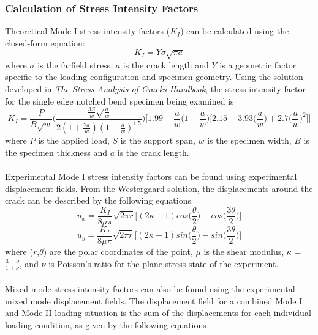 \documentclass[12pt]{article}
\begin{document}
\subsubsection{Calculation of Stress Intensity Factors} %
Theoretical Mode I stress intensity factors ($K_{I}$) can be calculated using the closed-form equation:
\begin{equation}
K_{I} = Y\sigma\sqrt{\pi a}
\end{equation}
where $\sigma$ is the farfield stress, $a$ is the crack length and $Y$ is a geometric factor specific to the loading configuration and specimen geometry. Using the solution developed in \textit{The Stress Analysis of Cracks Handbook}, the stress intensity factor for the single edge notched bend specimen being examined is \cite{notch}
\begin{equation}
K_{I} = \frac{P}{B\sqrt{w}}\Bigg(\frac{\frac{3S}{w}\sqrt{\frac{a}{w}}}{2(1+\frac{2a}{w})(1-\frac{a}{w})^{1.5}}\Bigg)\Bigg[1.99-\frac{a}{w}\Big(1-\frac{a}{w}\Big)\Big[2.15-3.93\Big(\frac{a}{w}\Big)+2.7\Big(\frac{a}{w}\Big)^2\Big]\Bigg]
\end{equation}
where $P$ is the applied load, $S$ is the support span, $w$ is the specimen width, $B$ is the specimen thickness and $a$ is the crack length. 
\\ \\
Experimental Mode I stress intensity factors can be found using experimental displacement fields. From the Westergaard solution, the displacements around the crack can be described by the following equations \cite{Fracture}
\begin{equation}
u_{x} = \frac{K_{I}}{8\mu \pi}\sqrt{2\pi r}\bigg[(2\kappa-1)cos\bigg(\frac{\theta}{2}\bigg)-cos\bigg(\frac{3\theta}{2}\bigg)\bigg]
\end{equation}
\begin{equation}
u_{y} = \frac{K_{I}}{8\mu \pi}\sqrt{2\pi r}\bigg[(2\kappa+1)sin\bigg(\frac{\theta}{2}\bigg)-sin\bigg(\frac{3\theta}{2}\bigg)\bigg]
\end{equation}
where ($r$,$\theta$) are the polar coordinates of the point, $\mu$ is the shear modulus, $\kappa$ = $\frac{3-\nu}{1+\nu}$, and $\nu$ is Poisson's ratio for the plane stress state of the experiment.
\\ \\
Mixed mode stress intensity factors can also be found using the experimental mixed mode displacement fields. The displacement field for a combined Mode I and Mode II loading situation is the sum of the displacements for each individual loading condition, as given by the following equations \cite{Fracture}
\end{document}
